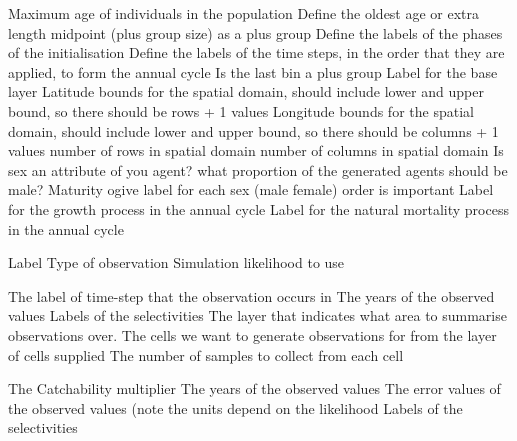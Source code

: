  {Maximum age of individuals in the population}
 {Define the oldest age or extra length midpoint (plus group size) as a plus group}
 {Define the labels of the phases of the initialisation}
 {Define the labels of the time steps, in the order that they are applied, to form the annual cycle}
 {}
 {Is the last bin a plus group}
 {Label for the base layer}
 {Latitude bounds for the spatial domain, should include lower and upper bound, so there should be rows + 1 values}
 {Longitude bounds for the spatial domain, should include lower and upper bound, so there should be columns + 1 values}
 {number of rows in spatial domain}
 {number of columns in spatial domain}
 {Is sex an attribute of you agent?}
 {what proportion of the generated agents should be male?}
 {Maturity ogive label for each sex (male female) order is important}
 {Label for the growth process in the annual cycle}
 {Label for the natural mortality process in the annual cycle}
\par\par
{} {Label}
 {Type of observation}
 {Simulation likelihood to use}
\par\textbf{}\par
{} {The label of time-step that the observation occurs in}
 {The years of the observed values}
 {Labels of the selectivities}
 {The layer that indicates what area to summarise observations over.}
 {The cells we want to generate observations for from the layer of cells supplied}
 {The number of samples to collect from each cell}
\par\textbf{}\par
{} {The Catchability multiplier}
 {The years of the observed values}
 {The error values of the observed values (note the units depend on the likelihood}
 {Labels of the selectivities}
